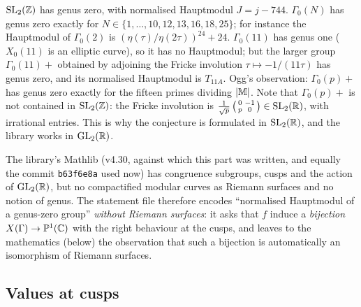 \begin{example}\label{ch16:ex:genus}
$\mathrm{SL}_2(\mathbb{Z})$ has genus zero, with normalised Hauptmodul $J=j-744$.  $\Gamma_0(N)$ has genus zero exactly for
$N\in\{1,\dots,10,12,13,16,18,25\}$; for instance the Hauptmodul of $\Gamma_0(2)$ is $(\eta(\tau)/\eta(2\tau))^{24}+24$.
$\Gamma_0(11)$ has genus one ($X_0(11)$ is an elliptic curve), so it has no Hauptmodul; but the larger group
$\Gamma_0(11)+$ obtained by adjoining the Fricke involution $\tau\mapsto-1/(11\tau)$ has genus zero, and its normalised
Hauptmodul is $T_{11A}$.  Ogg's observation: $\Gamma_0(p)+$ has genus zero exactly for the fifteen primes dividing
$|\mathbb{M}|$.  Note that $\Gamma_0(p)+$ is not contained in $\mathrm{SL}_2(\mathbb{Z})$: the Fricke involution is
$\frac1{\sqrt p}\left(\begin{smallmatrix}0&-1\\p&0\end{smallmatrix}\right)\in\mathrm{SL}_2(\mathbb{R})$, with irrational entries.  This is why the conjecture is
formulated in $\mathrm{SL}_2(\mathbb{R})$, and the library works in $\mathrm{GL}_2(\mathbb{R})$.
\end{example}

The library's Mathlib (v4.30, against which this part was written, and equally the commit \texttt{b63f6e8a} used now)
has congruence subgroups, cusps and the action of $\mathrm{GL}_2(\mathbb{R})$, but no compactified modular curves as Riemann
surfaces and no notion of genus.  The statement file therefore encodes ``normalised
Hauptmodul of a genus-zero group'' \emph{without Riemann surfaces}: it asks that $f$ induce a \emph{bijection}
$X(\Gamma)\to\mathbb{P}^1({\mathbb{C}})$ with the right behaviour at the cusps, and leaves to the mathematics (below) the
observation that such a bijection is automatically an isomorphism of Riemann surfaces.

\subsection{Values at cusps}

